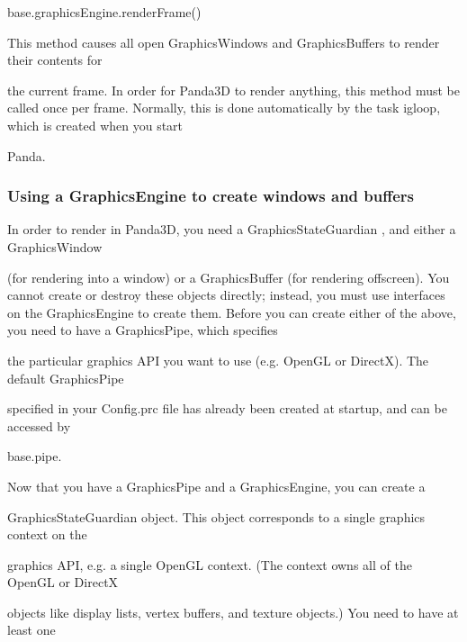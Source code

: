 \documentclass[a4paper]{article}
\newcommand\textstyleOOoComputerIdent[1]{\textrm{\textcolor[rgb]{0.0,0.5019608,0.0}{#1}}}
\newcommand\textstyleOOoComputerBase[1]{\textrm{\textcolor{black}{#1}}}
\begin{document}
{\ttfamily\color{black}
\textstyleOOoComputerIdent{base}\textstyleOOoComputerBase{.}\textstyleOOoComputerIdent{graphicsEngine}\textstyleOOoComputerBase{.}\textstyleOOoComputerIdent{renderFrame}\textstyleOOoComputerBase{()}}

{\color{black}
This method causes all open GraphicsWindows and GraphicsBuffers to render their contents for}

{\color{black}
the current frame. In order for Panda3D to render anything, this method must be called once per frame. Normally, this is
done automatically by the task {\textquotedbl}igloop{\textquotedbl}, which is created when you start}

{\color{black}
Panda. }


\bigskip

\clearpage\subsubsection[Using a GraphicsEngine to create windows and buffers]{Using a GraphicsEngine to create windows
and buffers}
\hypertarget{RefHeading3855869075401}{}
\bigskip

{\color{black}
In order to render in Panda3D, you need a GraphicsStateGuardian , and either a GraphicsWindow}

{\color{black}
(for rendering into a window) or a GraphicsBuffer (for rendering offscreen). You cannot create or destroy these objects
directly; instead, you must use interfaces on the GraphicsEngine to create them. Before you can create either of the
above, you need to have a GraphicsPipe, which specifies}

{\color{black}
the particular graphics API you want to use (e.g. OpenGL or DirectX). The default GraphicsPipe}

{\color{black}
specified in your Config.prc file has already been created at startup, and can be accessed by}

{\color{black}
base.pipe.}


\bigskip


\bigskip

{\color{black}
Now that you have a GraphicsPipe and a GraphicsEngine, you can create a}

{\color{black}
GraphicsStateGuardian object. This object corresponds to a single graphics context on the}

{\color{black}
graphics API, e.g. a single OpenGL context. (The context owns all of the OpenGL or DirectX}

{\color{black}
objects like display lists, vertex buffers, and texture objects.) You need to have at least one}
\end{document}
